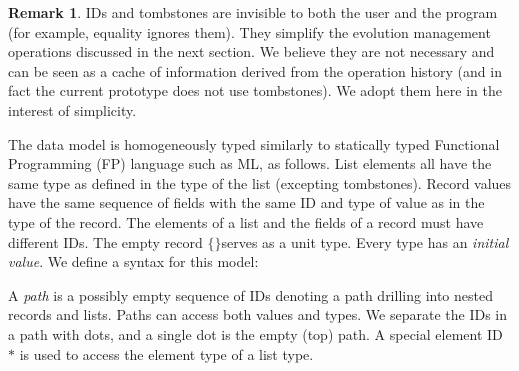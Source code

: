 \documentclass[english,submission]{programming}
\theoremstyle{definition}
\newtheorem*{remark}{Remark}
\newcommand{\mathbox}[1]{\colorbox{black!10}{$#1$}}
\newcommand{\is}{{:}\ }
\newcommand{\emptystring}{\textsf{\textquotedbl\ \!\textquotedbl}}
\begin{document}
\begin{remark}
IDs and tombstones are invisible to both the user and the program (for example, equality ignores them). They simplify the evolution management operations discussed in the next section. We believe they are not necessary and can be seen as a cache of information derived from the operation history (and in fact the current prototype does not use tombstones). We adopt them here in the interest of simplicity.
\end{remark}

The data model is homogeneously typed similarly to statically typed Functional Programming (FP) language such as ML, as follows. List elements all have the same type as defined in the type of the list (excepting tombstones). Record values have the same sequence of fields with the same ID and type of value as in the type of the record. The elements of a list and the fields of a record must have different IDs.
The empty record \mathbox{\text{\{\}}}serves as a unit type. Every type has an \textit{initial value}. We define a syntax for this model:

\tcbox{
\[ \begin{array}{r@{\ }l|r@{\ }l|r@{\ }l|l}
  \multicolumn{2}{l|}{\textrm{type}} & \multicolumn{2}{l|}{\textrm{value}} & \multicolumn{2}{l|}{\textrm{initial value}}&\\
  \hline
  T \Coloneqq & & v \Coloneqq & & T^\varnothing = & &\\
  &  \textsf{String} & & S & & \emptystring & \textrm{string}\\
  & \textsf{Number} & &  N & & \textsf{NaN} & \textrm{number}\\
  & \textsf{List } T & & [ E \is v \  \dots ] & & [] & \textrm{list}\\
  & \{ F \  S \is T \  \dots \} & & \{ F \is v \  \dots \} & & \{ F \is T^\varnothing \  \dots \}& \textrm{record}\\

  & \bot && \bigtimes & & \bigtimes & \textrm{tombstone}\\
\end{array}\]
}

A \textit{path} is a possibly empty sequence of IDs denoting a path drilling into nested records and lists. Paths can access both values and types. We separate the IDs in a path with dots, and a single dot is the empty (top) path. A special element ID~\mathbox{*} is used to access the element type of a list type.
\end{document}
